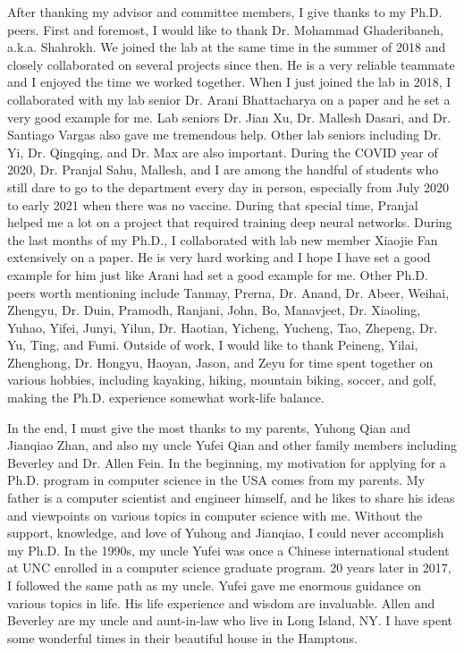 After thanking my advisor and committee members, I give thanks to my Ph.D. peers. First and foremost, I would like to thank Dr. Mohammad Ghaderibaneh, a.k.a. Shahrokh.
We joined the lab at the same time in the summer of 2018 and closely collaborated on several projects since then. 
He is a very reliable teammate and I enjoyed the time we worked together.
When I just joined the lab in 2018, I collaborated with my lab senior Dr. Arani Bhattacharya on a paper and he set a very good example for me. 
Lab seniors Dr. Jian Xu, Dr. Mallesh Dasari, and Dr. Santiago Vargas also gave me tremendous help. Other lab seniors including Dr. Yi, Dr. Qingqing, and Dr. Max are also important.
During the COVID year of 2020, Dr. Pranjal Sahu, Mallesh, and I are among the handful of students who still dare to go to the department every day in person, 
especially from July 2020 to early 2021 when there was no vaccine.
During that special time, Pranjal helped me a lot on a project that required training deep neural networks.
During the last months of my Ph.D., I collaborated with lab new member Xiaojie Fan extensively on a paper.
He is very hard working and I hope I have set a good example for him just like Arani had set a good example for me.
Other Ph.D. peers worth mentioning include Tanmay, Prerna, Dr. Anand, Dr. Abeer, Weihai, Zhengyu, Dr. Duin, Pramodh, Ranjani, John, Bo, Manavjeet, Dr. Xiaoling, Yuhao, Yifei, Junyi, Yilun, Dr. Haotian, Yicheng, Yucheng, Tao, Zhepeng, Dr. Yu, Ting, and Fumi.
Outside of work, I would like to thank Peineng, Yilai, Zhenghong, Dr. Hongyu, Haoyan, Jason, and Zeyu for time spent together on various hobbies, including kayaking, hiking, mountain biking, soccer, and golf, making the Ph.D. experience somewhat work-life balance.

In the end, I must give the most thanks to my parents, Yuhong Qian and Jianqiao Zhan, and also my uncle Yufei Qian 
and other family members including Beverley and Dr. Allen Fein.
In the beginning, my motivation for applying for a Ph.D. program in computer science in the USA comes from my parents.
My father is a computer scientist and engineer himself, and he likes to share his ideas and viewpoints on various topics in computer science with me.
Without the support, knowledge, and love of Yuhong and Jianqiao, I could never accomplish my Ph.D.
In the 1990s, my uncle Yufei was once a Chinese international student at UNC enrolled in a computer science graduate program.
20 years later in 2017, I followed the same path as my uncle. 
Yufei gave me enormous guidance on various topics in life. His life experience and wisdom are invaluable.
Allen and Beverley are my uncle and aunt-in-law who live in Long Island, NY. I have spent some wonderful times in their beautiful house in the Hamptons.

